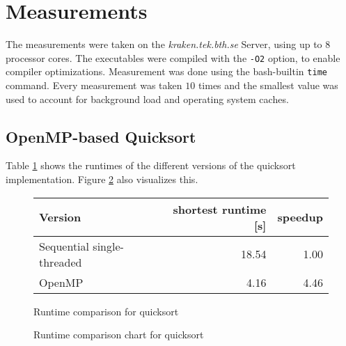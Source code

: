 \documentclass[]{article}
\begin{document}
\section{Measurements}

The measurements were taken on the \emph{kraken.tek.bth.se} Server, using up to $8$ processor cores. The executables were compiled with the \texttt{-O2} option, to enable compiler optimizations. Measurement was done using the bash-builtin \texttt{time} command. Every measurement was taken $10$ times and the smallest value was used to account for background load and operating system caches.

\subsection{OpenMP-based Quicksort}

Table \ref{tab:qsort-runtime} shows the runtimes of the different versions of the quicksort implementation. Figure \ref{fig:qsort-chart} also visualizes this.

\begin{figure}[h]
	\centering
	\begin{tabular}{|l|r|r|}
		\hline
		\textbf{Version} & \textbf{shortest runtime [s]} & \textbf{speedup} \\
		\hline
		Sequential single-threaded		& 18.54 & 1.00 \\
		\hline
		OpenMP 							& 4.16 & 4.46 \\ 
		\hline 
	\end{tabular} 
	\caption{Runtime comparison for quicksort}
	\label{tab:qsort-runtime}
\end{figure}

\begin{figure}[h]
	\centering
	\caption{Runtime comparison chart for quicksort}
	\label{fig:qsort-chart}
\end{figure}
\end{document}
